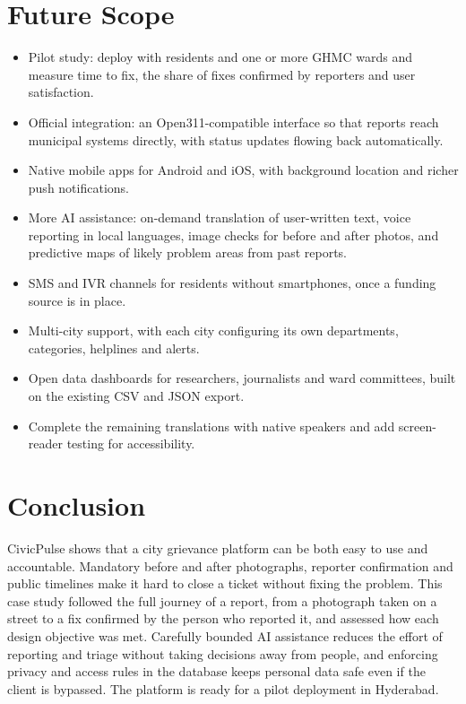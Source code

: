 \documentclass[conference]{IEEEtran}
\begin{document}
\section{Future Scope}
\begin{itemize}
\item Pilot study: deploy with residents and one or more GHMC wards and measure time to fix, the share of fixes confirmed by reporters and user satisfaction.
\item Official integration: an Open311-compatible interface \cite{b4} so that reports reach municipal systems directly, with status updates flowing back automatically.
\item Native mobile apps for Android and iOS, with background location and richer push notifications.
\item More AI assistance: on-demand translation of user-written text, voice reporting in local languages, image checks for before and after photos, and predictive maps of likely problem areas from past reports.
\item SMS and IVR channels for residents without smartphones, once a funding source is in place.
\item Multi-city support, with each city configuring its own departments, categories, helplines and alerts.
\item Open data dashboards for researchers, journalists and ward committees, built on the existing CSV and JSON export.
\item Complete the remaining translations with native speakers and add screen-reader testing for accessibility.
\end{itemize}
\section{Conclusion}
CivicPulse shows that a city grievance platform can be both easy to use and accountable. Mandatory before and after photographs, reporter confirmation and public timelines make it hard to close a ticket without fixing the problem. This case study followed the full journey of a report, from a photograph taken on a street to a fix confirmed by the person who reported it, and assessed how each design objective was met. Carefully bounded AI assistance reduces the effort of reporting and triage without taking decisions away from people, and enforcing privacy and access rules in the database keeps personal data safe even if the client is bypassed. The platform is ready for a pilot deployment in Hyderabad.
\end{document}
